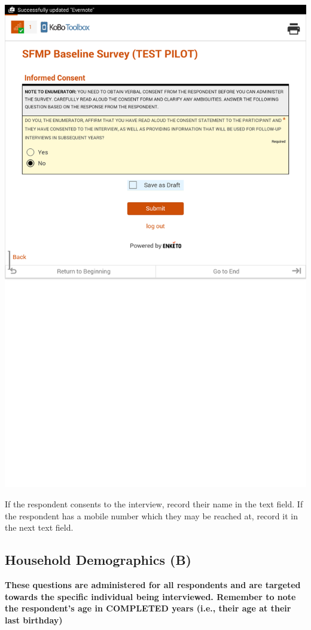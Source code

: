 \documentclass[a4paper]{refart}
\begin{document}
\includegraphics[width=\textwidth]{consent.png}

If the respondent consents to the interview, record their name in the text field. If the respondent has a mobile number which they may be reached at, record it in the next text field.


\subsection{Household Demographics (B)}
\textbf{These questions are administered for all respondents and are targeted towards the specific individual being interviewed. Remember to note the respondent's age in COMPLETED years (i.e., their age at their last birthday)}
\end{document}
